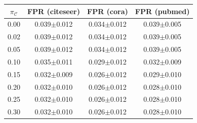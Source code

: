 \begin{tabular}{cccc}
\toprule
$\pi_{\mathcal{C}}$ & FPR (citeseer) & FPR (cora) & FPR (pubmed) \\
\midrule
0.00 & 0.039$\pm$0.012 & 0.034$\pm$0.012 & 0.039$\pm$0.005 \\
0.02 & 0.039$\pm$0.012 & 0.034$\pm$0.012 & 0.039$\pm$0.005 \\
0.05 & 0.039$\pm$0.012 & 0.034$\pm$0.012 & 0.039$\pm$0.005 \\
0.10 & 0.035$\pm$0.011 & 0.029$\pm$0.012 & 0.032$\pm$0.009 \\
0.15 & 0.032$\pm$0.009 & 0.026$\pm$0.012 & 0.029$\pm$0.010 \\
0.20 & 0.032$\pm$0.010 & 0.026$\pm$0.012 & 0.028$\pm$0.010 \\
0.25 & 0.032$\pm$0.010 & 0.026$\pm$0.012 & 0.028$\pm$0.010 \\
0.30 & 0.032$\pm$0.010 & 0.026$\pm$0.012 & 0.028$\pm$0.010 \\
\bottomrule
\end{tabular}
